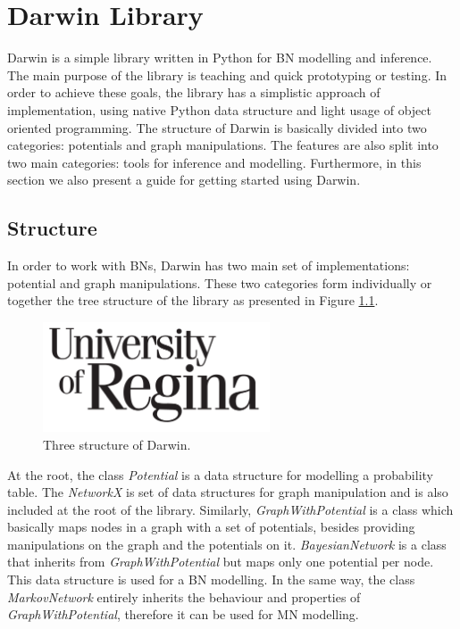 \chapter{Darwin Library}
\label{sec:darwin_lib}

Darwin is a simple library written in Python for BN modelling and inference.
The main purpose of the library is teaching and quick prototyping or testing.
In order to achieve these goals, the library has a simplistic approach of implementation, using native Python data structure and light usage of object oriented programming.
The structure of Darwin is basically divided into two categories: potentials and graph manipulations.
The features are also split into two main categories: tools for inference and modelling.
Furthermore, in this section we also present a guide for getting started using Darwin.

\section{Structure}
\label{sec:system:sec1}

In order to work with BNs, Darwin has two main set of implementations: potential and graph manipulations.
These two categories form individually or together the tree structure of the library as presented in Figure \ref{fig:tree_darwin}.

\begin{figure}[hbt]
    \begin{center}
        \includegraphics[width=0.6\textwidth]{img/logo_uofr_black}
    \end{center}
    \caption{Three structure of Darwin.}
    \label{fig:tree_darwin}
\end{figure}

At the root, the class \emph{Potential} is a data structure for modelling a probability table.
The \emph{NetworkX} is set of data structures for graph manipulation and is also included at the root of the library.
Similarly, \emph{GraphWithPotential} is a class which basically maps nodes in a graph with a set of potentials, besides providing manipulations on the graph and the potentials on it.
\emph{BayesianNetwork} is a class that inherits from \emph{GraphWithPotential} but maps only one potential per node.
This data structure is used for a BN modelling.
In the same way, the class \emph{MarkovNetwork} entirely inherits the behaviour and properties of \emph{GraphWithPotential}, therefore it can be used for MN modelling.

